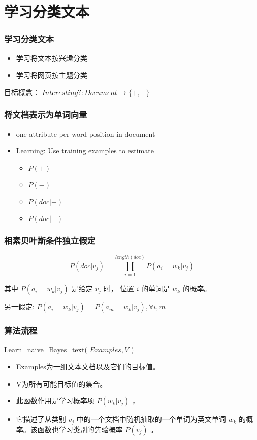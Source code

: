 \documentclass{beamer}
\begin{document}
\section{学习分类文本}
\label{sec-9}
\begin{frame}
\frametitle{学习分类文本}
\label{sec-9-1}

\begin{itemize}
\item 学习将文本按兴趣分类
\item 学习将网页按主题分类
\end{itemize}


目标概念： $Interesting? : Document \rightarrow \{+,-\}$
\end{frame}
\begin{frame}
\frametitle{将文档表示为单词向量}
\label{sec-9-2}

\begin{itemize}
\item one attribute per word position in document
\item Learning: Use training examples to estimate
\begin{itemize}
\item $P(+)$
\item $P(-)$
\item $P(doc|+)$
\item $P(doc|-)$
\end{itemize}
\end{itemize}
\end{frame}
\begin{frame}
\frametitle{相素贝叶斯条件独立假定}
\label{sec-9-3}


$$P(doc|v_j) = \prod_{i=1}^{length(doc)} P(a_i=w_k | v_j)$$

其中 $P(a_i=w_k| v_j)$ 是给定 $v_j$ 时， 位置 $i$ 的单词是 $w_k$ 的概率。

另一假定: $P(a_i=w_k|v_j) = P(a_m=w_k|v_j), \forall i,m$
\end{frame}
\begin{frame}
\frametitle{算法流程}
\label{sec-9-4}

Learn\_{}naive\_{}Bayes\_{}text( $Examples, V$ )
\begin{itemize}
\item Examples为一组文本文档以及它们的目标值。
\item V为所有可能目标值的集合。
\item 此函数作用是学习概率项 $P(w_k|v_j)$ ，
\item 它描述了从类别 $v_j$ 中的一个文档中随机抽取的一个单词为英文单词 $w_k$ 的概率。该函数也学习类别的先验概率 $P(v_j)$ 。
\end{itemize}
\end{frame}
\end{document}
